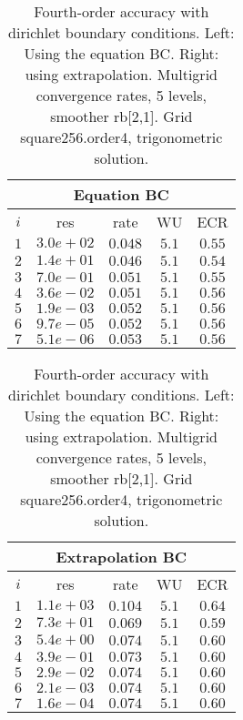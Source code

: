 \begin{table}[hbt]
\begin{center}
\begin{tabular}{|c|c|c|c|c|} \hline 
 \multicolumn{5}{|c|}{Equation BC}\\   \hline 
 $i$   & res      & rate    &  WU    & ECR  \\   \hline 
 $ 1$  & $ 3.0e+02$ & $0.048$ & $ 5.1$ & $0.55$ \\ 
 $ 2$  & $ 1.4e+01$ & $0.046$ & $ 5.1$ & $0.54$ \\ 
 $ 3$  & $ 7.0e-01$ & $0.051$ & $ 5.1$ & $0.55$ \\ 
 $ 4$  & $ 3.6e-02$ & $0.051$ & $ 5.1$ & $0.56$ \\ 
 $ 5$  & $ 1.9e-03$ & $0.052$ & $ 5.1$ & $0.56$ \\ 
 $ 6$  & $ 9.7e-05$ & $0.052$ & $ 5.1$ & $0.56$ \\ 
 $ 7$  & $ 5.1e-06$ & $0.053$ & $ 5.1$ & $0.56$ \\ 
\hline 
\end{tabular} \qquad
\begin{tabular}{|c|c|c|c|c|} \hline 
 \multicolumn{5}{|c|}{Extrapolation BC}\\   \hline 
 $i$   & res      & rate    &  WU    & ECR  \\   \hline 
 $ 1$  & $ 1.1e+03$ & $0.104$ & $ 5.1$ & $0.64$ \\ 
 $ 2$  & $ 7.3e+01$ & $0.069$ & $ 5.1$ & $0.59$ \\ 
 $ 3$  & $ 5.4e+00$ & $0.074$ & $ 5.1$ & $0.60$ \\ 
 $ 4$  & $ 3.9e-01$ & $0.073$ & $ 5.1$ & $0.60$ \\ 
 $ 5$  & $ 2.9e-02$ & $0.074$ & $ 5.1$ & $0.60$ \\ 
 $ 6$  & $ 2.1e-03$ & $0.074$ & $ 5.1$ & $0.60$ \\ 
 $ 7$  & $ 1.6e-04$ & $0.074$ & $ 5.1$ & $0.60$ \\ 
\hline 
\end{tabular}\\
\end{center}
\caption{Fourth-order accuracy with dirichlet boundary conditions. Left: Using the equation BC. Right: using extrapolation. Multigrid convergence rates, 5 levels, smoother rb[2,1]. Grid square256.order4, trigonometric solution.}
\label{tab:boundaryConditions4} 
\end{table}

